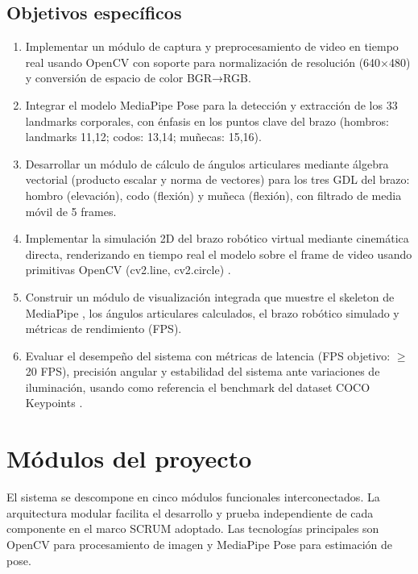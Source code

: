 \subsection{Objetivos específicos}
\begin{enumerate}
    \item Implementar un módulo de captura y preprocesamiento de video en tiempo real usando OpenCV \cite{Bradski2000} con soporte para normalización de resolución (640×480) y conversión de espacio de color BGR→RGB.
    \item Integrar el modelo MediaPipe Pose \cite{Bazarevskyetal2020} para la detección y extracción de los 33 landmarks corporales, con énfasis en los puntos clave del brazo (hombros: landmarks 11,12; codos: 13,14; muñecas: 15,16).
    \item Desarrollar un módulo de cálculo de ángulos articulares mediante álgebra vectorial (producto escalar y norma de vectores) para los tres GDL del brazo: hombro (elevación), codo (flexión) y muñeca (flexión), con filtrado de media móvil de 5 frames.
    \item Implementar la simulación 2D del brazo robótico virtual mediante cinemática directa, renderizando en tiempo real el modelo sobre el frame de video usando primitivas OpenCV (cv2.line, cv2.circle) \cite{Bradski2000}.
    \item Construir un módulo de visualización integrada que muestre el skeleton de MediaPipe \cite{Lugaresietal2019}, los ángulos articulares calculados, el brazo robótico simulado y métricas de rendimiento (FPS).
    \item Evaluar el desempeño del sistema con métricas de latencia (FPS objetivo: $\geq$ 20 FPS), precisión angular y estabilidad del sistema ante variaciones de iluminación, usando como referencia el benchmark del dataset COCO Keypoints \cite{10.1007/978-3-319-10602-1_48}.
\end{enumerate}

\section{Módulos del proyecto}
El sistema se descompone en cinco módulos funcionales interconectados. La arquitectura modular facilita el desarrollo y prueba independiente de cada componente en el marco SCRUM adoptado. Las tecnologías principales son OpenCV \cite{Bradski2000} para procesamiento de imagen y MediaPipe Pose \cite{Bazarevskyetal2020, 10.1007/978-3-319-10602-1_48} para estimación de pose.


